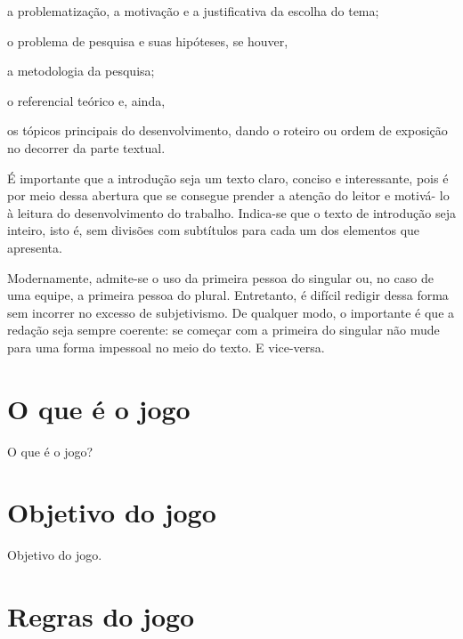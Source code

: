 \documentclass[12pt,oneside,a4paper,chapter=TITLE,section=TITLE,sumario
=tradicional]{abntex2}
\begin{document}
\begin{lista}
    \item a problematização, a motivação e a justificativa da escolha do tema;
    \item o problema de pesquisa e suas hipóteses, se houver,
    \item a metodologia da pesquisa;
    \item o referencial teórico e, ainda,
    \item os tópicos principais do desenvolvimento, dando o roteiro ou
    ordem de exposição no decorrer da parte textual.
\end{lista}

É importante que a introdução seja um texto claro, conciso e interessante, pois 
é por meio dessa abertura que se consegue prender a atenção do leitor e motivá- 
lo à leitura do desenvolvimento do trabalho. Indica-se que o texto de 
introdução seja inteiro, isto é, sem divisões com subtítulos para cada um dos 
elementos que apresenta.

Modernamente, admite-se o uso da primeira pessoa do singular ou, no caso de uma 
equipe, a primeira pessoa do plural. Entretanto, é difícil redigir dessa forma 
sem incorrer no excesso de subjetivismo. De qualquer modo, o importante é que a 
redação seja sempre coerente: se começar com a primeira do singular não mude 
para uma forma impessoal no meio do texto. E vice-versa.

\chapter{O que é o jogo}
\label{cap:o-que-eh-o-jogo}

O que é o jogo?

\chapter{Objetivo do jogo}
\label{cap:objetivo-do-jogo}

Objetivo do jogo.

\chapter{Regras do jogo}
\label{cap:regras-do-jogo}
\end{document}
